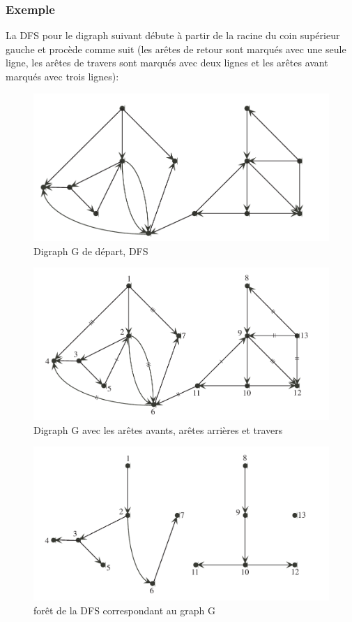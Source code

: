 \subsubsection{Exemple}
La DFS pour le digraph suivant débute à partir de la racine du coin supérieur gauche et procède comme suit (les arêtes de retour sont marqués avec une seule ligne, les arêtes de travers sont marqués avec deux lignes et les arêtes avant marqués avec trois lignes):
\begin{figure}[h]
\centering
\includegraphics[width=0.7\linewidth]{images/grath-oriente-1}
\caption{Digraph G de départ, DFS}
\label{fig:grath-oriente-1}
\end{figure}
\begin{figure}[h]
\centering
\includegraphics[width=0.7\linewidth]{images/grath-oriente-2}
\caption{Digraph G avec les arêtes avants, arêtes arrières et travers}
\label{fig:grath-oriente-2}
\end{figure}
\begin{figure}[h]
\centering
\includegraphics[width=0.7\linewidth]{images/grath-oriente-3}
\caption{forêt de la DFS correspondant au graph G}
\label{fig:grath-oriente-3}
\end{figure}













 
 